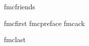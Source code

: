 










\LANG

\langi fmcfriends


\langi fmcfirst
\printshorttoc
\printlongtoc
\langi fmcpreface
\langi fmcack

\oddpage


\oddpage
\printpartpage{\appendicesterm}
\oddpage


\oddpage


\langi fmclast

\bye
